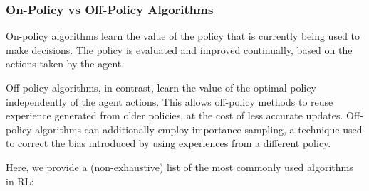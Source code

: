\subsubsection{On-Policy vs Off-Policy Algorithms}

On-policy algorithms learn the value of the policy that is currently being used to make decisions. 
The policy is evaluated and improved continually, based on the actions taken by the agent.

Off-policy algorithms, in contrast, learn the value of the optimal policy independently of the agent actions.
This allows off-policy methods to reuse experience generated from older policies, at the cost of less accurate updates.
Off-policy algorithms can additionally employ importance sampling, a technique used to correct the bias introduced by using experiences from a different policy.

Here, we provide a (non-exhaustive) list of the most commonly used algorithms in RL:

